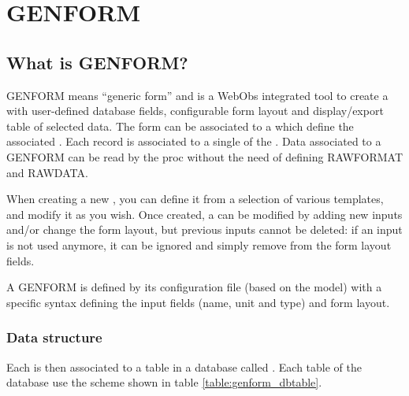 
\section{GENFORM} \label{genform}


\subsection{What is GENFORM?}

GENFORM means “generic form” and is a WebObs integrated tool to create a  with user-defined database fields, configurable form layout and display/export table of selected data. The form can be associated to a  which define the associated . Each record is associated to a single  of the . Data associated to a GENFORM can be read by the proc without the need of defining RAWFORMAT and RAWDATA.

When creating a new , you can define it from a selection of various templates, and modify it as you wish. Once created, a  can be modified by adding new inputs and/or change the form layout, but previous inputs cannot be deleted: if an input is not used anymore, it can be ignored and simply remove from the form layout fields.

A GENFORM is defined by its configuration file (based on the  model) with a specific syntax defining the input fields (name, unit and type) and form layout.


\subsubsection{Data structure}

Each  is then associated to a table in a database called . Each table of the database use the scheme shown in table \ref{table:genform_dbtable}.

